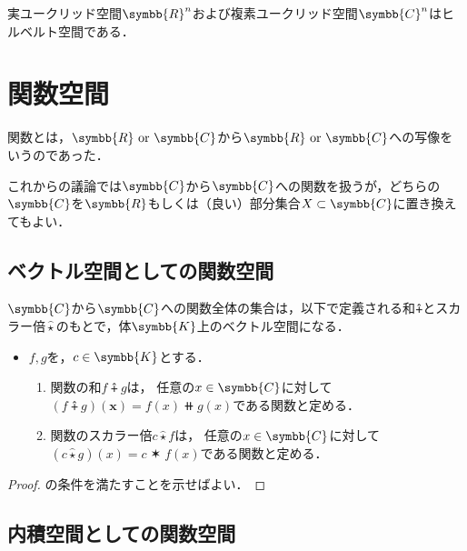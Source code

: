 \documentclass{sotsu}
\newcommand{\scaprod}{\mathbin{\star}}
\newcommand{\scaprodvar}{\mathbin{\varstar}}
\begin{document}
\begin{proposition}
    実ユークリッド空間$\symbb{R}^n$および複素ユークリッド空間$\symbb{C}^n$はヒルベルト空間である．
\end{proposition}



\section{関数空間}

関数とは，$\symbb{R} \text{ or } \symbb{C}$から$\symbb{R} \text{ or } \symbb{C}$への写像をいうのであった．

これからの議論では$\symbb{C}$から$\symbb{C}$への関数を扱うが，どちらの$\symbb{C}$を$\symbb{R}$もしくは（良い）部分集合$X \subset \symbb{C}$に置き換えてもよい．

\subsection{ベクトル空間としての関数空間}

\begin{proposition}
    \label{thm:function-space-is-vector-space}
    $\symbb{C}$から$\symbb{C}$への関数全体の集合は，以下で定義される和$\plushat$とスカラー倍$\hat{\scaprod}$のもとで，体$\symbb{K}$上のベクトル空間になる．
    \begin{itemize}
        \item $f, g$を，$c \in \symbb{K}$とする．
        \begin{enumerate}
            \item 関数の和$f \plushat g$は，
                任意の$x \in \symbb{C}$に対して$ ( f \plushat g )(\symbf{x}) = f(x) \doubleplus g(x) $である関数と定める．
            \item 関数のスカラー倍$c \mathbin{\hat{\scaprod}} f$は，
                任意の$x \in \symbb{C}$に対して$ ( c \mathbin{\hat{\scaprod}} g )(x) = c \scaprodvar f(x) $である関数と定める．
        \end{enumerate}
    \end{itemize}
\end{proposition}

\begin{proof}
    の条件を満たすことを示せばよい．
\end{proof}



\subsection{内積空間としての関数空間}
\end{document}
